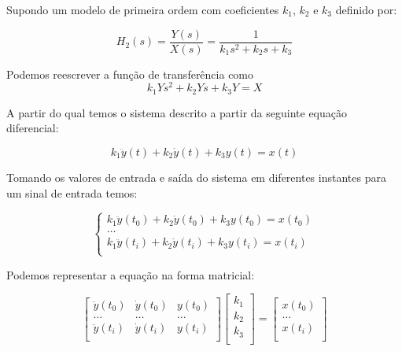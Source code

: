 \documentclass[a4paper,11pt]{article}
\begin{document}
Supondo um modelo de primeira ordem com coeficientes $k_1$, $k_2$ e $k_3$ definido por:

\begin{equation}
    H_2(s) = \frac{Y(s)}{X(s)} = \frac{1}{k_1 s^2+ k_2 s+ k_3}
\end{equation}


Podemos reescrever a função de transferência como
\begin{equation}
k_1 Ys^2 + k_2 Ys + k_3 Y  = X
\end{equation}

A partir do qual temos o sistema descrito a partir da seguinte equação diferencial:

\begin{equation}
k_1 \ddot{y}(t) + k_2 \dot{y}(t) + k_3 y(t) = x(t)
\end{equation}

Tomando os valores de entrada e saída do sistema em diferentes instantes para um sinal de entrada temos:

\begin{equation}
\left\{\begin{array}{c}
    k_1 \ddot{y}(t_0) + k_2 \dot{y}(t_0) + k_3 y(t_0) = x(t_0)  \\
    \dots\\
    k_1 \ddot{y}(t_i) + k_2 \dot{y}(t_i) + k_3 y(t_i) = x(t_i)  \\
\end{array} \right.
\end{equation}


Podemos representar a equação na forma matricial:

\begin{equation}
\left[\begin{array}{ccc}
    \ddot{y}(t_0) & \dot{y}(t_0) & y(t_0)\\
    \dots  & \dots & \dots \\
    \ddot{y}(t_i) & \dot{y}(t_i) & y(t_i)\\
\end{array} \right]
\left[\begin{array}{c}
    k_1\\
    k_2\\
    k_3\\
\end{array} \right]
=
\left[\begin{array}{c}
    x(t_0)  \\
    \dots\\
    x(t_i)  \\
\end{array} \right]
\end{equation}
\end{document}
